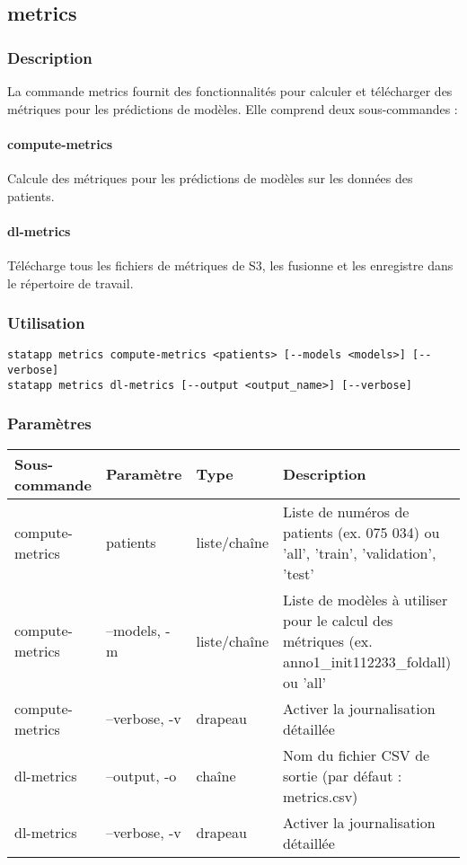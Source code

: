 \documentclass{article}
\begin{document}
\subsection{metrics}
\subsubsection{Description}
La commande metrics fournit des fonctionnalités pour calculer et télécharger des métriques pour les prédictions de modèles. Elle comprend deux sous-commandes :

\paragraph{compute-metrics}
Calcule des métriques pour les prédictions de modèles sur les données des patients.

\paragraph{dl-metrics}
Télécharge tous les fichiers de métriques de S3, les fusionne et les enregistre dans le répertoire de travail.

\subsubsection{Utilisation}
\begin{lstlisting}
statapp metrics compute-metrics <patients> [--models <models>] [--verbose]
statapp metrics dl-metrics [--output <output_name>] [--verbose]
\end{lstlisting}

\subsubsection{Paramètres}
\begin{tabulary}{\linewidth}{LLLL}
\toprule
\textbf{Sous-commande} & \textbf{Paramètre} & \textbf{Type} & \textbf{Description} \\
\midrule
compute-metrics & patients & liste/chaîne & Liste de numéros de patients (ex. 075 034) ou 'all', 'train', 'validation', 'test' \\
compute-metrics & --models, -m & liste/chaîne & Liste de modèles à utiliser pour le calcul des métriques (ex. anno1\_init112233\_foldall) ou 'all' \\
compute-metrics & --verbose, -v & drapeau & Activer la journalisation détaillée \\
\midrule
dl-metrics & --output, -o & chaîne & Nom du fichier CSV de sortie (par défaut : metrics.csv) \\
dl-metrics & --verbose, -v & drapeau & Activer la journalisation détaillée \\
\bottomrule
\end{tabulary}
\end{document}
